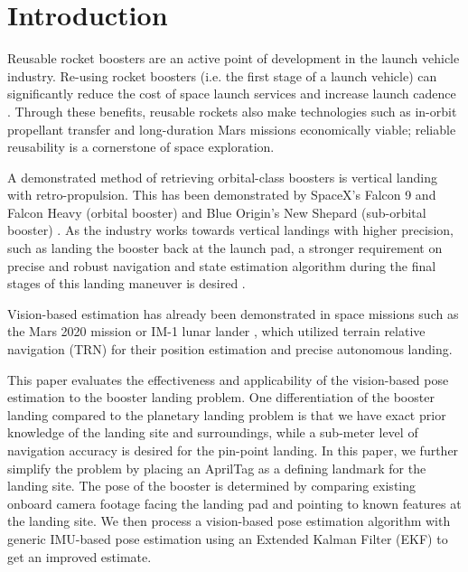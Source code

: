 \documentclass[conference]{IEEEtran}
\begin{document}
\section{Introduction}

Reusable rocket boosters are an active point of development in the launch vehicle industry. 
Re-using rocket boosters (i.e. the first stage of a launch vehicle) can significantly reduce the cost of space launch services and increase launch cadence \cite{shotwell2021space}. 
Through these benefits, reusable rockets also make technologies such as in-orbit propellant transfer and long-duration Mars missions economically viable; reliable reusability is a cornerstone of space exploration.

A demonstrated method of retrieving orbital-class boosters is vertical landing with retro-propulsion. 
This has been demonstrated by SpaceX's Falcon 9 and Falcon Heavy (orbital booster) and Blue Origin's New Shepard (sub-orbital booster) \cite{maggio2023vision} \cite{blackmore2016autonomous}. 
As the industry works towards vertical landings with higher precision, such as landing the booster back at the launch pad, a stronger requirement on precise and robust navigation and state estimation algorithm during the final stages of this landing maneuver is desired \cite{blackmore2016autonomous}.

Vision-based estimation has already been demonstrated in space missions such as the Mars 2020 mission \cite{johnson2022mars} or IM-1 lunar lander \cite{christian2021image}, which utilized terrain relative navigation (TRN) for their position estimation and precise autonomous landing. 

This paper evaluates the effectiveness and applicability of the vision-based pose estimation to the booster landing problem. 
One differentiation of the booster landing compared to the planetary landing problem is that we have exact prior knowledge of the landing site and surroundings, while a sub-meter level of navigation accuracy is desired for the pin-point landing. 
In this paper, we further simplify the problem by placing an AprilTag \cite{kallwies2020determining} as a defining landmark for the landing site. 
The pose of the booster is determined by comparing existing onboard camera footage facing the landing pad and pointing to known features at the landing site.
We then process a vision-based pose estimation algorithm with generic IMU-based pose estimation using an Extended Kalman Filter (EKF) to get an improved estimate.  
\end{document}
